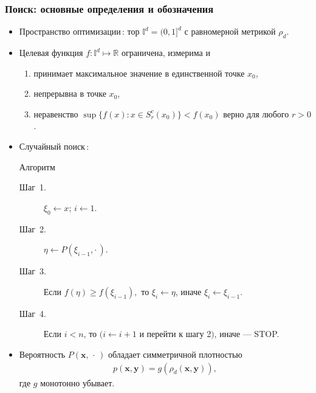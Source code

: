 \documentclass[pdf, intlimits, 14pt, unicode]{beamer} %
\begin{document}
\begin{frame}
    \frametitle{Поиск: основные определения и обозначения}

    \begin{itemize}
        \item<1-> \alert{Пространство оптимизации\,:} тор
        $\mathbb{I}^d=(0,1]^d$ с равномерной метрикой $\rho_d$.
        \item<2-> \alert{Целевая функция}
        $f:\mathbb{I}^d\mapsto\mathbb{R}$
        ограничена, измерима и
        \begin{enumerate}
            \item принимает максимальное значение в единственной точке
            $x_0$,
            \item непрерывна в точке $x_0$,
            \item неравенство $\sup\{f(x):x\in S_r^c(x_0)\}<f(x_0)$ верно
            для любого $r>0$.
        \end{enumerate}
        \item<3-> \alert{Случайный поиск\,:}
        \begin{center} {Алгоритм}
        \end{center}
        \begin{description}
            \item[Шаг~1.] $\xi_0 \gets x$; $i \gets 1$.
            \item[Шаг~2.] $\eta \gets P(\xi_{i-1},\cdot\,)$.
            \item[Шаг~3.] Если $f(\eta)\geq f(\xi_{i-1}),$ то $\xi_{i}
            \gets \eta$, иначе $\xi_{i} \gets \xi_{i-1}$.
            \item[Шаг~4.] Если $i < n$, то $\big(i \leftarrow i + 1$ и
            перейти к шагу 2$\big)$, иначе --- STOP.
        \end{description}
        \item<4-> Вероятность $P(\mathbf{x},\,\cdot\,)$ обладает
        \alert{симметричной} плотностью
        \begin{gather*}
            p(\mathbf{x},\mathbf{y})=g(\rho_d(\mathbf{x},\mathbf{y})),
        \end{gather*}
        где $g$ монотонно убывает.
    \end{itemize}
\end{frame}
\end{document}
